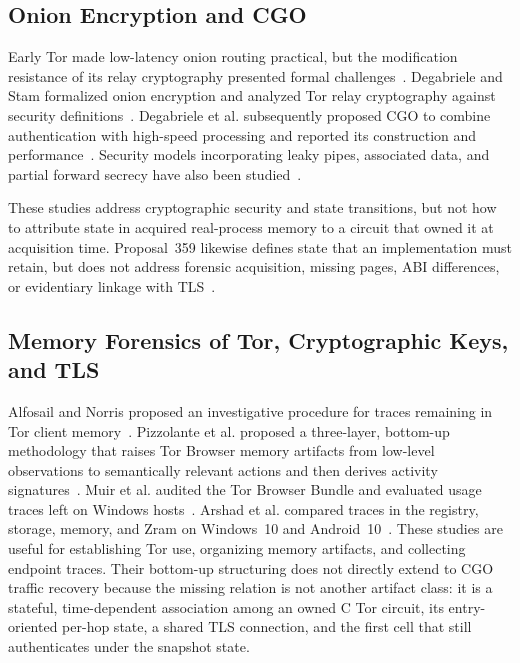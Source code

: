 \documentclass[10pt,a4paper]{article}
\begin{document}
\subsection{Onion Encryption and CGO}

Early Tor made low-latency onion routing practical, but the modification resistance of its relay cryptography presented formal challenges~\cite{dingledine2004tor}.
Degabriele and Stam formalized onion encryption and analyzed Tor relay cryptography against security definitions~\cite{degabriele2018untagging}.
Degabriele et al. subsequently proposed CGO to combine authentication with high-speed processing and reported its construction and performance~\cite{degabriele2025cgo}.
Security models incorporating leaky pipes, associated data, and partial forward secrecy have also been studied~\cite{degabriele2025secure}.

These studies address cryptographic security and state transitions, but not how to attribute state in acquired real-process memory to a circuit that owned it at acquisition time.
Proposal~359 likewise defines state that an implementation must retain, but does not address forensic acquisition, missing pages, ABI differences, or evidentiary linkage with TLS~\cite{torproposal359}.

\subsection{Memory Forensics of Tor, Cryptographic Keys, and TLS}

Alfosail and Norris proposed an investigative procedure for traces remaining in Tor client memory~\cite{alfosail2021tor}.
Pizzolante et al. proposed a three-layer, bottom-up methodology that raises Tor Browser memory artifacts from low-level observations to semantically relevant actions and then derives activity signatures~\cite{pizzolante2021torbrowser}.
Muir et al. audited the Tor Browser Bundle and evaluated usage traces left on Windows hosts~\cite{muir2019forensic}.
Arshad et al. compared traces in the registry, storage, memory, and Zram on Windows~10 and Android~10~\cite{arshad2021forensic}.
These studies are useful for establishing Tor use, organizing memory artifacts, and collecting endpoint traces. Their bottom-up structuring does not directly extend to CGO traffic recovery because the missing relation is not another artifact class: it is a stateful, time-dependent association among an owned C Tor circuit, its entry-oriented per-hop state, a shared TLS connection, and the first cell that still authenticates under the snapshot state.
\end{document}
